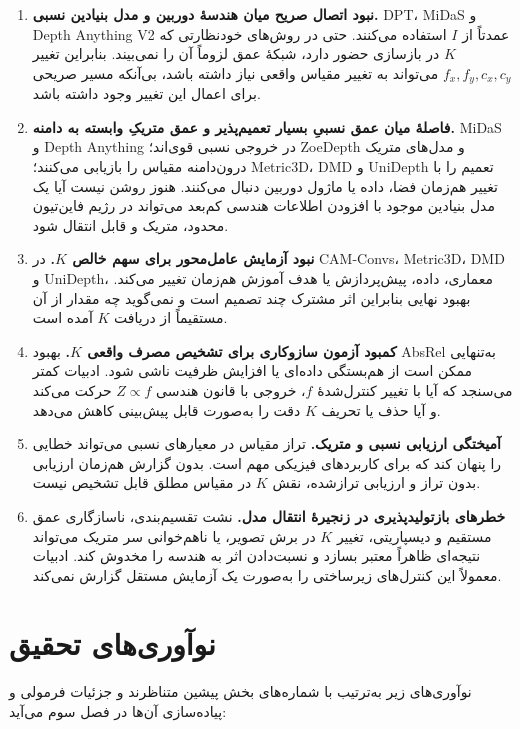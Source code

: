 \begin{enumerate}
\item \textbf{نبود اتصال صریح میان هندسهٔ دوربین و مدل بنیادین نسبی.} DPT، MiDaS و Depth Anything V2 عمدتاً از $I$ استفاده می‌کنند. حتی در روش‌های خودنظارتی که $K$ در بازسازی حضور دارد، شبکهٔ عمق لزوماً آن را نمی‌بیند. بنابراین تغییر $f_x,f_y,c_x,c_y$ می‌تواند به تغییر مقیاس واقعی نیاز داشته باشد، بی‌آنکه مسیر صریحی برای اعمال این تغییر وجود داشته باشد.
\item \textbf{فاصلهٔ میان عمق نسبیِ بسیار تعمیم‌پذیر و عمق متریکِ وابسته به دامنه.} MiDaS و Depth Anything در خروجی نسبی قوی‌اند؛ ZoeDepth و مدل‌های متریک درون‌دامنه مقیاس را بازیابی می‌کنند؛ Metric3D، DMD و UniDepth تعمیم را با تغییر هم‌زمان فضا، داده یا ماژول دوربین دنبال می‌کنند. هنوز روشن نیست آیا یک مدل بنیادین موجود با افزودن اطلاعات هندسی کم‌بعد می‌تواند در رژیم فاین‌تیون محدود، متریک و قابل انتقال شود.
\item \textbf{نبود آزمایش عامل‌محور برای سهم خالص $K$.} در CAM-Convs، Metric3D، DMD و UniDepth، معماری، داده، پیش‌پردازش یا هدف آموزش هم‌زمان تغییر می‌کند. بهبود نهایی بنابراین اثر مشترک چند تصمیم است و نمی‌گوید چه مقدار از آن مستقیماً از دریافت $K$ آمده است.
\item \textbf{کمبود آزمون سازوکاری برای تشخیص مصرف واقعی $K$.} بهبود AbsRel به‌تنهایی ممکن است از هم‌بستگی داده‌ای یا افزایش ظرفیت ناشی شود. ادبیات کمتر می‌سنجد که آیا با تغییر کنترل‌شدهٔ $f$، خروجی با قانون هندسی $Z\propto f$ حرکت می‌کند و آیا حذف یا تحریف $K$ دقت را به‌صورت قابل پیش‌بینی کاهش می‌دهد.
\item \textbf{آمیختگی ارزیابی نسبی و متریک.} تراز مقیاس در معیارهای نسبی می‌تواند خطایی را پنهان کند که برای کاربردهای فیزیکی مهم است. بدون گزارش هم‌زمان ارزیابی بدون تراز و ارزیابی تراز‌شده، نقش $K$ در مقیاس مطلق قابل تشخیص نیست.
\item \textbf{خطرهای بازتولیدپذیری در زنجیرهٔ انتقال مدل.} نشت تقسیم‌بندی، ناسازگاری عمق مستقیم و دیسپاریتی، تغییر $K$ در برش تصویر، یا ناهم‌خوانی سر متریک می‌تواند نتیجه‌ای ظاهراً معتبر بسازد و نسبت‌دادن اثر به هندسه را مخدوش کند. ادبیات معمولاً این کنترل‌های زیرساختی را به‌صورت یک آزمایش مستقل گزارش نمی‌کند.
\end{enumerate}

\section{نوآوری‌های تحقیق}
\label{sec:ch2_contributions}
نوآوری‌های زیر به‌ترتیب با شماره‌های بخش پیشین متناظرند و جزئیات فرمولی و پیاده‌سازی آن‌ها در فصل سوم می‌آید:

